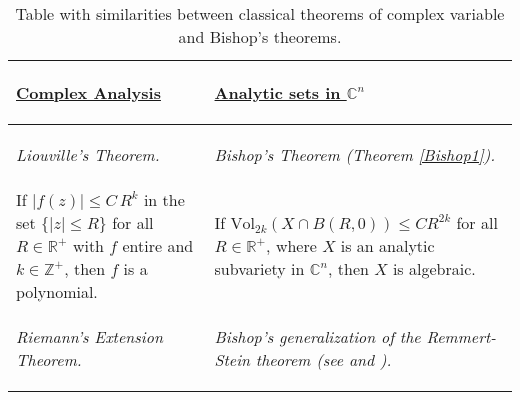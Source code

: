 \documentclass{article}
\newcommand{\zah}{\ensuremath{ \mathbb Z }}
\newcommand{\con}{\ensuremath{\mathbb{C}^n}}
\newcommand{\re}{\ensuremath{\mathbb R }}
\begin{document}
\begin{table}[hpt]
        \caption{Table with similarities between classical theorems of complex variable and Bishop's theorems.}\label{Tab}
        \centering
        \begin{tabular}{|m{5.5cm}|m{5.5cm}|} \hline
                        \begin{center} \vspace*{0.2cm}
                                \underline{\textbf{Complex Analysis}}
                        \end{center} &
                        \begin{center} \vspace*{0.2cm}
                                \underline{\textbf{Analytic sets in $\con$}}
                        \end{center} \\
                \hline
                \begin{center}
                        \textit{Liouville's Theorem.}
                \end{center} &
                \begin{center}
                        \textit{Bishop's Theorem (Theorem \ref{Bishop1}).}
                \end{center}\\
                        \hline If $\vert f(z)\vert\leq C\,R^k$ in the set $\{\vert z\vert\leq R\}$
                        for all $R\in\re^{+}$ with $f$ entire and $k\in\zah^{+}$, then
                        $f$ is a polynomial.
                        &
                        \vspace{0.1cm}
                        If $\textrm{Vol}_{2k}(X\cap B(R,0))\leq CR^{2k}$ for all
                        $R\in\re^{+}$, where $X$ is an analytic subvariety in $\con$, then $X$ is algebraic.\\
                        \hline
                        \vspace{0.1cm}
                        \begin{center}
                        \textit{Riemann's Extension Theorem.}
                \end{center}
                        &
                \begin{center}
                        \textit{Bishop's generalization of the Remmert-Stein theorem (see \cite{R-S} and \cite[p. 34]{Stolzenberg}).}
                \end{center} \\

\end{tabular}
\end{table}
\end{document}
